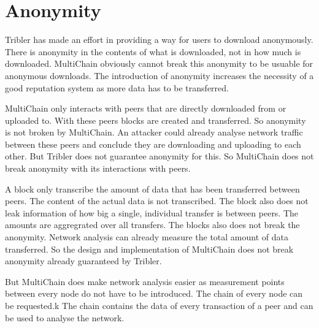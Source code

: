 \section{Anonymity}
Tribler has made an effort in providing a way for users to download anonymously\cite{Plak-anonymous}\cite{ruigrok-anonymous}.
There is anonymity in the contents of what is downloaded, not in how much is downloaded.
MultiChain obviously cannot break this anonymity to be usuable for anonymous downloads.
The introduction of anonymity increases the necessity of a good reputation system as more data has to be transferred.

MultiChain only interacts with peers that are directly downloaded from or uploaded to.
With these peers blocks are created and transferred.
So anonymity is not broken by MultiChain.
An attacker could already analyse network traffic between these peers
and conclude they are downloading and uploading to each other.
But Tribler does not guarantee anonymity for this.
So MultiChain does not break anonymity with its interactions with peers.

A block only transcribe the amount of data that has been transferred between peers.
The content of the actual data is not transcribed.
The block also does not leak information of how big a single, individual transfer is between peers.
The amounts are aggregrated over all transfers.
The blocks also does not break the anonymity.
Network analysis can already measure the total amount of data transferred.
So the design and implementation of MultiChain does not break anonymity already guaranteed by Tribler.

But MultiChain does make network analysis easier as measurement points between every node do not have to be introduced.
The chain of every node can be requested.k
The chain contains the data of every transaction of a peer and can be used to analyse the network.